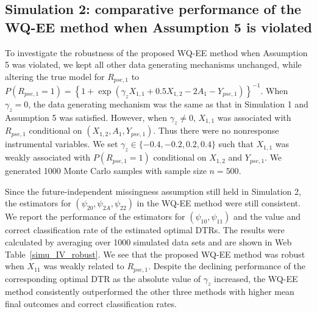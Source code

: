 \documentclass[12pt]{article}
\begin{document}
      


\subsection{Simulation 2: comparative performance of the WQ-EE method when Assumption 5 is violated}

To investigate the robustness of the proposed WQ-EE method when Assumption 5 was violated, we kept all other data generating mechanisms unchanged, while altering the true model for $R_{pse,1}$ to $P(R_{pse,1}=1) = \left\{1+\exp(\gamma_z X_{1,1} + 0.5X_{1,2}-2A_1-Y_{pse,1})\right\}^{-1}$. When $\gamma_z=0$, the data generating mechanism was the same as that in Simulation 1 and Assumption 5 was satisfied. However, when $\gamma_z \neq 0$, $X_{1,1}$ was associated  with $R_{pse,1}$ conditional on $(X_{1,2},A_1,Y_{pse,1})$. Thus there were no nonresponse instrumental variables. We set $\gamma_z \in \{-0.4,-0.2,0.2,0.4\}$ such that $X_{1,1}$ was weakly associated with $P(R_{pse,1}=1)$ conditional  on $X_{1,2}$ and $Y_{pse,1}$.  We generated 1000 Monte Carlo samples with sample size $n=500$. 

Since the future-independent missingness assumption still held in Simulation 2, the estimators for $(\psi_{20},\psi_{2A},\psi_{22})$  in the WQ-EE method were still consistent. We report the performance of the estimators for $(\psi_{10},\psi_{11})$ and the value and correct classification rate of the estimated optimal DTRs. The results were calculated by averaging over  1000 simulated data sets and are shown in Web Table~\ref{simu_IV_robust}. We see that the proposed WQ-EE method was robust when $X_{11}$ was weakly related to $R_{pse,1}$. Despite the declining performance of the corresponding optimal DTR as the absolute value of $\gamma_z$ increased, the WQ-EE method consistently outperformed the other three methods with higher mean final outcomes and correct classification rates.
\end{document}
